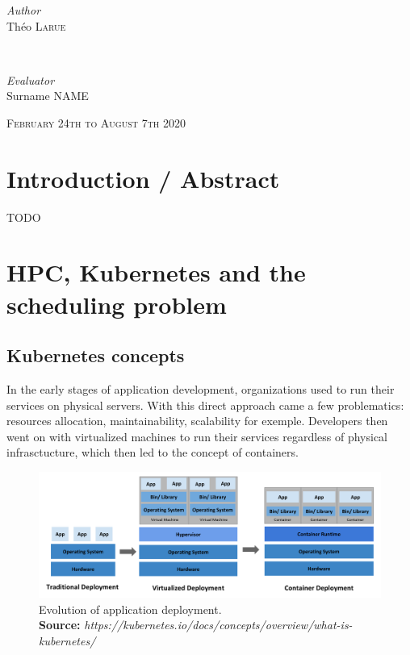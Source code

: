 \documentclass[12pt]{report}
\newcommand*{\captionsource}[2]{%
    \caption[{#1}]{%
        #1%
        \\\hspace{\linewidth}%
	\textbf{Source:} \textit{#2}%
    }%
}
\begin{document}
\begin{titlepage}
    \begin{minipage}{0.4\textwidth}
        \begin{flushleft}
            \large
	    \textit{Author}\\
            Théo \textsc{Larue}
        \end{flushleft}
    \end{minipage}
    ~
    \begin{minipage}{0.4\textwidth}
        \begin{flushright}
            \large
	    \textit{Evaluator}\\
	    Surname \textsc{NAME}
        \end{flushright}
    \end{minipage}

    \vspace{2cm}

    \vspace{2cm}
    \vfill
    \textsc{\large February 24th to August 7th 2020}\\[0.5cm]


\end{titlepage}

\tableofcontents
\newpage

\chapter{Introduction / Abstract}
TODO


\chapter{HPC, Kubernetes and the scheduling problem}

\section{Kubernetes concepts}

In the early stages of application development, organizations used to run their
services on physical servers. With this direct approach came a few
problematics: resources allocation, maintainability, scalability for exemple.
Developers then went on with virtualized machines to run their services
regardless of physical infrasctucture, which then led to the concept of
containers.

\begin{figure}[h]
	\centering
	\includegraphics[width=\textwidth]{../imgs/container_evolution.png}
	\captionsource{Evolution of application deployment.}{https://kubernetes.io/docs/concepts/overview/what-is-kubernetes/}
	\label{fig:container-evolution}
\end{figure}
\end{document}
